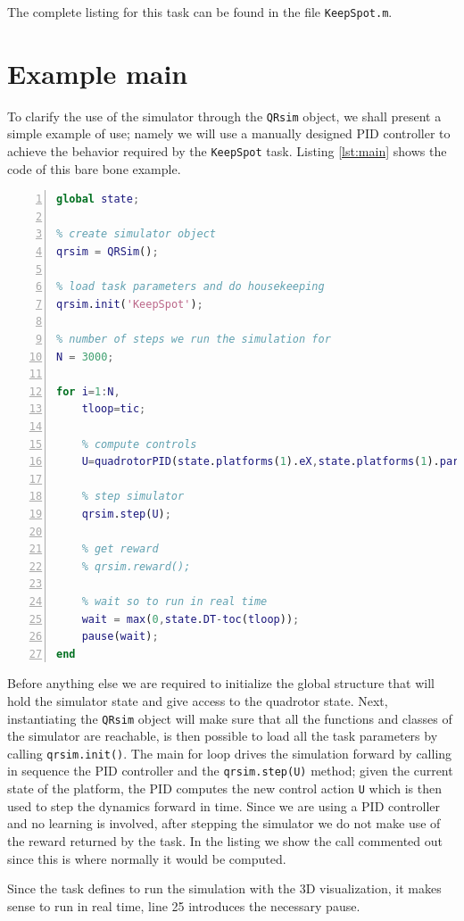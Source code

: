 \documentclass[a4paper,11pt]{report}
\newcommand{\sname}{QRsim\xspace}
\begin{document}
The complete listing for this task can be found in the file \texttt{KeepSpot.m}.  

\section{Example main}
To clarify the use of the simulator through the \texttt{\sname} object, we shall present a simple example of use; namely we will use a manually designed PID controller to achieve the behavior required by the \texttt{KeepSpot} task.
Listing \ref{lst:main} shows the code of this bare bone example. 
\begin{lstlisting}[float=ht!bp,caption=main script,language=Matlab,frame=lines,label=lst:main,numbers=left,basicstyle=\small]
global state;

% create simulator object
qrsim = QRSim();

% load task parameters and do housekeeping
qrsim.init('KeepSpot');

% number of steps we run the simulation for
N = 3000;

for i=1:N,
    tloop=tic;    

    % compute controls
    U=quadrotorPID(state.platforms(1).eX,state.platforms(1).params.X(1:3));
    
    % step simulator 
    qrsim.step(U);

    % get reward
    % qrsim.reward();

    % wait so to run in real time
    wait = max(0,state.DT-toc(tloop));   
    pause(wait);    
end
\end{lstlisting}
Before anything else we are required to initialize the global structure that will hold the simulator state and give access to the quadrotor state. Next, instantiating the \texttt{\sname} object will make sure that all the functions and classes of the simulator are reachable, is then possible to load all the task parameters by calling \texttt{qrsim.init()}. 
The main for loop drives the simulation forward by calling in sequence the PID controller and the \texttt{qrsim.step(U)} method; given the current state of the platform, the PID computes the new control action  \texttt{U} which is then used to step the dynamics forward in time.
Since we are using a PID controller and no learning is involved, after stepping the simulator we do not make use of the reward returned by the task. In the listing we show the call commented out since this is where normally it would be computed.

Since the task defines to run the simulation with the 3D visualization, it makes sense to run in real time, line 25 introduces the necessary pause.  
\end{document}
